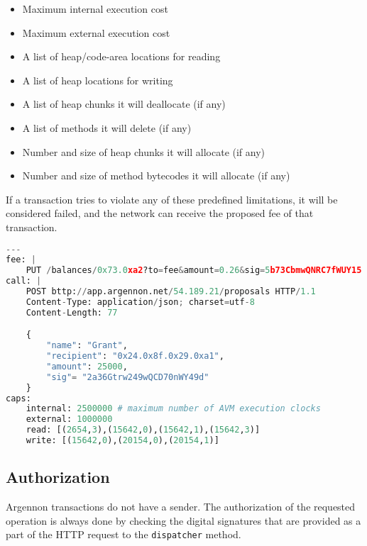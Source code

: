 \begin{itemize}
    \item Maximum internal execution cost
    \item Maximum external execution cost
    \item A list of heap/code-area locations for reading
    \item A list of heap locations for writing
    \item A list of heap chunks it will deallocate (if any)
    \item A list of methods it will delete (if any)
    \item Number and size of heap chunks it will allocate (if any)
    \item Number and size of method bytecodes it will allocate (if any)
\end{itemize}

If a transaction tries to violate any of these predefined limitations, it will be considered failed, and the network
can receive the proposed fee of that transaction.

\begin{lstlisting}[language=python, frame=TB, float, title=An Argennon transaction in YAML format,label={lst:txn-example}]
---
fee: |
    PUT /balances/0x73.0xa2?to=fee&amount=0.26&sig=5b73CbmwQNRC7fWUY15 HTTP/1.1
call: |
    POST bttp://app.argennon.net/54.189.21/proposals HTTP/1.1
    Content-Type: application/json; charset=utf-8
    Content-Length: 77

    {
        "name": "Grant",
        "recipient": "0x24.0x8f.0x29.0xa1",
        "amount": 25000,
        "sig"= "2a36Gtrw249wQCD70nWY49d"
    }
caps:
    internal: 2500000 # maximum number of AVM execution clocks
    external: 1000000
    read: [(2654,3),(15642,0),(15642,1),(15642,3)]
    write: [(15642,0),(20154,0),(20154,1)]
\end{lstlisting}

\subsection{Authorization}\label{subsec:txn-auth}

Argennon transactions do not have a sender. The authorization of the requested operation is always done by checking the
digital signatures that are provided as a part of the HTTP request to the \texttt{dispatcher} method.


